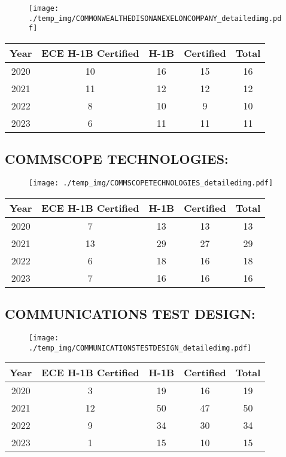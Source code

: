 \documentclass{article}%
\begin{document}
\begin{figure}[htbp]%
\centering%
\texttt{[image: ./temp\_img/COMMONWEALTHEDISONANEXELONCOMPANY\_detailedimg.pdf]}%
\end{figure}

%
\begin{longtable}{c|c|c|c|c}%
\hline%
Year&ECE H{-}1B Certified&H{-}1B&Certified&Total\\%
\hline%
2020&10&16&15&16\\%
\hline%
2021&11&12&12&12\\%
\hline%
2022&8&10&9&10\\%
\hline%
2023&6&11&11&11\\%
\hline%
\end{longtable}

%
\newpage%
\subsection{COMMSCOPE TECHNOLOGIES:}%
\label{subsec:COMMSCOPETECHNOLOGIES}%
\label{COMMSCOPETECHNOLOGIESdetailed}%


\begin{figure}[htbp]%
\centering%
\texttt{[image: ./temp\_img/COMMSCOPETECHNOLOGIES\_detailedimg.pdf]}%
\end{figure}

%
\begin{longtable}{c|c|c|c|c}%
\hline%
Year&ECE H{-}1B Certified&H{-}1B&Certified&Total\\%
\hline%
2020&7&13&13&13\\%
\hline%
2021&13&29&27&29\\%
\hline%
2022&6&18&16&18\\%
\hline%
2023&7&16&16&16\\%
\hline%
\end{longtable}

%
\newpage%
\subsection{COMMUNICATIONS TEST DESIGN:}%
\label{subsec:COMMUNICATIONSTESTDESIGN}%
\label{COMMUNICATIONSTESTDESIGNdetailed}%


\begin{figure}[htbp]%
\centering%
\texttt{[image: ./temp\_img/COMMUNICATIONSTESTDESIGN\_detailedimg.pdf]}%
\end{figure}

%
\begin{longtable}{c|c|c|c|c}%
\hline%
Year&ECE H{-}1B Certified&H{-}1B&Certified&Total\\%
\hline%
2020&3&19&16&19\\%
\hline%
2021&12&50&47&50\\%
\hline%
2022&9&34&30&34\\%
\hline%
2023&1&15&10&15\\%
\hline%
\end{longtable}
\end{document}
